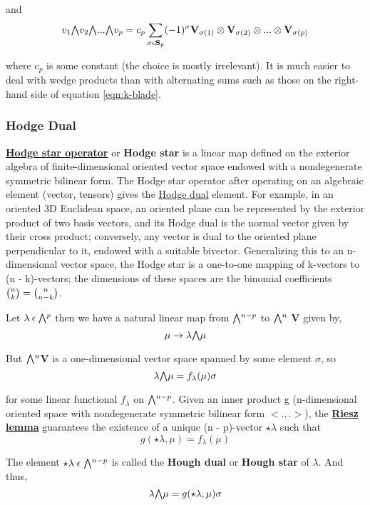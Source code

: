and 
\begin{equation}
    v_1 \exterior v_2 \exterior ... \exterior v_p = c_p \sum_{\sigma \epsilon\textbf{S}_p} (-1)^\sigma \textbf{V}_{\sigma(1)} \otimes \textbf{V}_{\sigma(2)} \otimes ... \otimes \textbf{V}_{\sigma(p)}
    \label{eqn:k-blade}
\end{equation}

where c$_p$ is some constant (the choice is mostly irrelevant).
It is much easier to deal with wedge products than with alternating
sums such as those on the right-hand side of equation \ref{eqn:k-blade}.


\subsubsection{Hodge Dual}
\href{https://en.wikipedia.org/wiki/Hodge_star_operator}{\textbf{Hodge star operator}} or  \textbf{Hodge star} is a linear map defined
on the exterior algebra of finite-dimensional oriented vector space endowed with a nondegenerate symmetric bilinear form.
The Hodge star operator after operating on an algebraic element (vector, tensors) gives the  
\href{https://bose.res.in/~amitabha/diffgeom/chap17.pdf}{Hodge dual} element.
For example, in an oriented 3D Euclidean space, an oriented plane can be represented by the exterior product of two basis vectors, 
and its Hodge dual is the normal vector given by their cross product; conversely, any vector is dual to the oriented plane perpendicular to it, endowed with a suitable bivector. 
Generalizing this to an n-dimensional vector space, the Hodge star is a one-to-one mapping of k-vectors to (n - k)-vectors; the dimensions of these spaces are the binomial coefficients 
${\tbinom {n}{k}}={\tbinom {n}{n-k}}$.

Let $\lambda \: \epsilon \: \exterior ^ p$ then we have a natural linear map from $\exterior ^ {n-p}$ to $\exterior ^ {n}$ \textbf{V} given by,
\begin{equation}
    \mu \rightarrow \lambda \exterior \mu
\end{equation}

But $\exterior ^n$\textbf{V} is a one-dimensional vector space spanned by some element $\sigma$, so
\begin{equation}
    \lambda \exterior \mu = f_\lambda (\mu) \sigma
\end{equation}

for some linear functional $f_\lambda$ on $\exterior ^{n-p}$. Given an inner product g (n-dimensional oriented
space with nondegenerate symmetric bilinear form $<.,.>$), 
the \href{https://en.wikipedia.org/wiki/Riesz%27s_lemma}{\textbf{Riesz lemma}} guarantees the existence of a unique (n - p)-vector $\star \lambda$ such that
\begin{equation}
    g(\star \lambda, \mu) = f_\lambda (\mu)
\end{equation}

The element $\star \lambda \; \epsilon \; \exterior ^ {n-p}$ is called the \textbf{Hough dual} or \textbf{Hough star} of $\lambda$. And thus,
\begin{equation}
    \lambda \exterior \mu = g(\star \lambda, \mu) \sigma
\end{equation}

\newpage
